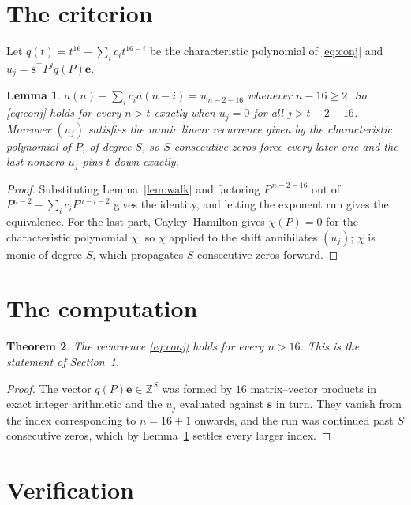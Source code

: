 \documentclass[11pt,a4paper]{article}
\theoremstyle{plain}
\newtheorem{theorem}{Theorem}
\newtheorem{lemma}[theorem]{Lemma}
\theoremstyle{definition}
\begin{document}
\section{The criterion}

Let $q(t)=t^{16}-\sum_i c_i t^{16-i}$ be the characteristic polynomial of
\eqref{eq:conj} and $u_j=\mathbf{s}^{\!\top}P^{j}q(P)\mathbf{e}$.

\begin{lemma}\label{lem:crit}
$a(n)-\sum_i c_i a(n-i)=u_{\,n-2-16}$ whenever $n-16\ge2$. So \eqref{eq:conj}
holds for every $n>t$ exactly when $u_j=0$ for all $j>t-2-16$. Moreover $(u_j)$
satisfies the monic linear recurrence given by the characteristic polynomial of $P$, of
degree $S$, so $S$ consecutive zeros force every later one and the last nonzero $u_j$ pins
$t$ down exactly.
\end{lemma}

\begin{proof}
Substituting Lemma~\ref{lem:walk} and factoring $P^{\,n-2-16}$ out of
$P^{n-2}-\sum_i c_i P^{n-i-2}$ gives the identity, and letting the exponent run gives the
equivalence. For the last part, Cayley--Hamilton gives $\chi(P)=0$ for the characteristic
polynomial $\chi$, so $\chi$ applied to the shift annihilates $(u_j)$; $\chi$ is monic of
degree $S$, which propagates $S$ consecutive zeros forward.
\end{proof}

\section{The computation}

\begin{theorem}
The recurrence \eqref{eq:conj} holds for every $n>16$. This is the statement of
Section~1.
\end{theorem}

\begin{proof}
The vector $q(P)\mathbf{e}\in\mathbb{Z}^{S}$ was formed by $16$ matrix--vector
products in exact integer arithmetic and the $u_j$ evaluated against $\mathbf{s}$ in turn.
They vanish from the index corresponding to $n=16+1$ onwards, and the run was continued
past $S$ consecutive zeros, which by Lemma~\ref{lem:crit} settles every larger index.
\end{proof}

\section{Verification}
\end{document}
